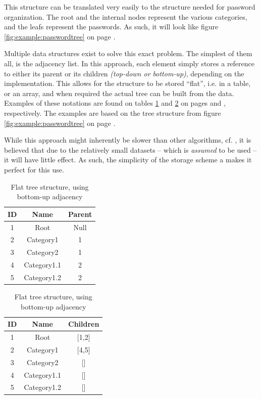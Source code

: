 			This structure can be translated very easily to the structure needed for password organization. The root and the internal nodes represent the various categories, and the leafs represent the passwords. As such, it will look like figure \ref{fig:example:passwordtree} on page \pageref{fig:example:passwordtree}.

			Multiple data structures exist to solve this exact problem. The simplest of them all, is the adjacency list. In this approach, each element simply stores a reference to either its parent or its children \emph{(top-down or bottom-up)}, depending on the implementation. This allows for the structure to be stored ``flat'', i.e. in a table, or an array, and when required the actual tree can be built from the data. Examples of these notations are found on tables \ref{table:example:tree:buttomup} and \ref{table:example:tree:topdown} on pages \pageref{table:example:tree:buttomup} and \pageref{table:example:tree:topdown}, respectively. The examples are based on the tree structure from figure \ref{fig:example:passwordtree} on page \pageref{fig:example:passwordtree}.

			While this approach might inherently be slower than other algorithms, cf. \cite{heirarchial_database}, it is believed that due to the relatively small datasets -- which is \emph{assumed} to be used -- it will have little effect. As such, the simplicity of the storage scheme a makes it perfect for this use.

			\begin{table}[p]
				\centering
				\begin{tabular}{c|c|c}
					\textbf{ID} 	& 	\textbf{Name} 	& \textbf{Parent} 	\\
					\hline
					\hline
					1 				& Root 				& Null 				\\
					2 				& Category1 		& 1 				\\
					3 				& Category2 		& 1 				\\
					4 				& Category1.1 		& 2 				\\
					5 				& Category1.2 		& 2 				\\
				\end{tabular}
				\caption{Flat tree structure, using bottom-up adjacency}
				\label{table:example:tree:buttomup}
			\end{table}
			\begin{table}[p]
				\centering
				\begin{tabular}{c|c|c}
					\textbf{ID} 	& 	\textbf{Name} 	& \textbf{Children} \\
					\hline
					\hline
					1 				& Root 				& [1,2] 			\\
					2 				& Category1 		& [4,5] 			\\
					3 				& Category2 		& [] 				\\
					4 				& Category1.1 		& [] 				\\
					5 				& Category1.2 		& [] 				\\
				\end{tabular}
				\caption{Flat tree structure, using bottom-up adjacency}
				\label{table:example:tree:topdown}
			\end{table}

